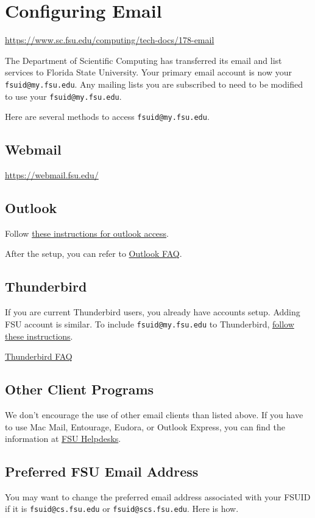 \documentclass[12pt,a4paper]{article}
\begin{document}
\section{Configuring Email}
\url{https://www.sc.fsu.edu/computing/tech-docs/178-email}

The Department of Scientific Computing has transferred its email and list services to Florida State University. Your primary email account is now your \texttt{fsuid@my.fsu.edu}. Any mailing lists you are subscribed to need to be modified to use your \texttt{fsuid@my.fsu.edu}.

Here are several methods to access \texttt{fsuid@my.fsu.edu}.

\subsection*{Webmail}
\url{https://webmail.fsu.edu/}

\subsection*{Outlook}
Follow \href{https://its.fsu.edu/help/it-support/email-calendars/student-email-accounts/configure-outlook-your-student-email}{these instructions for outlook access}.

After the setup, you can refer to \href{https://www.sc.fsu.edu/computing/tech-docs/234-outlook-faq}{Outlook FAQ}.

\subsection*{Thunderbird}
If you are current Thunderbird users, you already have accounts setup. Adding FSU account is similar. To include \texttt{fsuid@my.fsu.edu} to Thunderbird, \href{https://support.mozilla.org/en-US/kb/automatic-account-configuration}{follow these instructions}.

\href{https://www.sc.fsu.edu/computing/tech-docs/233-thunderbird-faq}{Thunderbird FAQ}

\subsection*{Other Client Programs}
We don't encourage the use of other email clients than listed above. If you have to use Mac Mail, Entourage, Eudora, or Outlook Express, you can find the information at \href{https://its.fsu.edu/help}{FSU Helpdesks}.

\subsection*{Preferred FSU Email Address}
You may want to change the preferred email address associated with your FSUID if it is \texttt{fsuid@cs.fsu.edu} or \texttt{fsuid@scs.fsu.edu}. Here is how.
\end{document}
